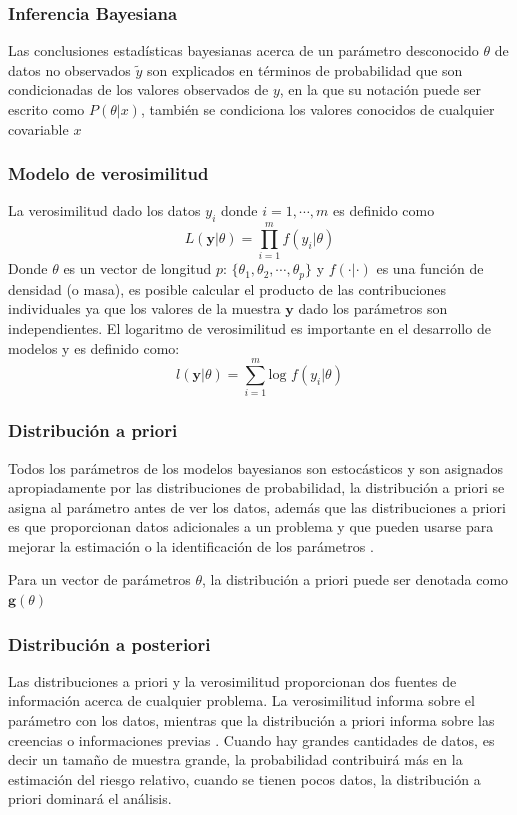 \subsubsection{Inferencia Bayesiana}
Las conclusiones estadísticas bayesianas acerca de un parámetro desconocido $\theta$ de datos no observados $\tilde{y}$ son explicados en términos de probabilidad que son condicionadas de los valores observados de $y$, en la que su notación puede ser escrito como $P(\theta | x)$, también se condiciona los valores conocidos de cualquier covariable $x$ \cite{gelman1995bayesian}

\subsubsection{Modelo de verosimilitud}\parencite{lawson2018bayesian}
La verosimilitud dado los datos $y_i$ donde $i = 1, \cdots, m$ es definido como
$$
L(\mathbf{y}|\theta) = \prod\limits_{i = 1}^{m}f({y}_{i}|\theta)
$$
Donde $\theta$ es un vector de longitud $p$: $\{ {\theta}_{1}, {\theta}_{2}, \cdots , {\theta}_{p} \}$ y $f(\cdot | \cdot)$ es una función de densidad (o masa), es posible calcular el producto de las contribuciones individuales ya que los valores de la muestra $\mathbf{y}$ dado los parámetros son independientes. El logaritmo de verosimilitud es importante en el desarrollo de modelos y es definido como:
$$
l(\mathbf{y}| \theta) = \sum\limits_{i = 1}^{m}\text{log }f({y}_{i}| \theta)
$$

\subsubsection{Distribución a priori}
Todos los parámetros de los modelos bayesianos son estocásticos y son asignados apropiadamente por las distribuciones de probabilidad, la distribución a priori se asigna al parámetro antes de ver los datos, además que las distribuciones a priori es que proporcionan datos adicionales a un problema y que pueden usarse para mejorar la estimación o la identificación de los parámetros \parencite{lawson2018bayesian}.

Para un vector de parámetros $\theta$, la distribución a priori puede ser denotada como $\mathbf{g}(\theta)$

\subsubsection{Distribución a posteriori}
Las distribuciones a priori y la verosimilitud proporcionan dos fuentes de información acerca de cualquier problema. La verosimilitud informa sobre el parámetro con los datos, mientras que la distribución a priori informa sobre las creencias o informaciones previas \parencite{lawson2018bayesian}. Cuando hay grandes cantidades de datos, es decir un tamaño de muestra grande, la probabilidad contribuirá más en la estimación del riesgo relativo, cuando se tienen pocos datos, la distribución a priori dominará el análisis.


